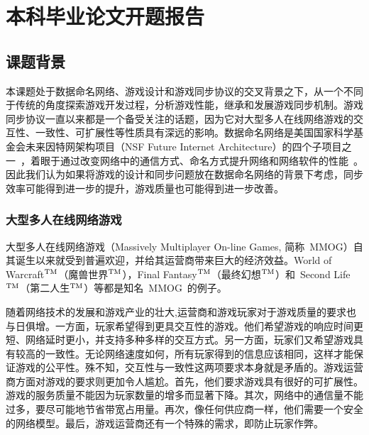 \chapter{本科毕业论文开题报告}

\def\tm{\leavevmode\hbox{$\rm {}^{TM}$}} %
\section{课题背景}
本课题处于数据命名网络、游戏设计和游戏同步协议的交叉背景之下，从一个不同于传统的角度探索游戏开发过程，分析游戏性能，继承和发展游戏同步机制。游戏同步协议一直以来都是一个备受关注的话题，因为它对大型多人在线网络游戏的交互性、一致性、可扩展性等性质具有深远的影响。数据命名网络是美国国家科学基金会未来因特网架构项目（NSF Future Internet Architecture）的四个子项目之一~\cite{nsffia}，着眼于通过改变网络中的通信方式、命名方式提升网络和网络软件的性能~\cite{Jndn}。因此我们认为如果将游戏的设计和同步问题放在数据命名网络的背景下考虑，同步效率可能得到进一步的提升，游戏质量也可能得到进一步改善。

\subsection{大型多人在线网络游戏}
大型多人在线网络游戏（Massively Multiplayer On-line Games, 简称~MMOG）自其诞生以来就受到普遍欢迎，并给其运营商带来巨大的经济效益。World of Warcraft\tm（魔兽世界\tm），Final Fantasy\tm（最终幻想\tm）和~Second Life\tm（第二人生\tm）等都是知名~MMOG~的例子。

随着网络技术的发展和游戏产业的壮大,运营商和游戏玩家对于游戏质量的要求也与日俱增。一方面，玩家希望得到更具交互性的游戏。他们希望游戏的响应时间更短、网络延时更小，并支持多种多样的交互方式。另一方面，玩家们又希望游戏具有较高的一致性。无论网络速度如何，所有玩家得到的信息应该相同，这样才能保证游戏的公平性。殊不知，交互性与一致性这两项要求本身就是矛盾的。游戏运营商方面对游戏的要求则更加令人尴尬。首先，他们要求游戏具有很好的可扩展性。游戏的服务质量不能因为玩家数量的增多而显著下降。其次，网络中的通信量不能过多，要尽可能地节省带宽占用量。再次，像任何供应商一样，他们需要一个安全的网络模型。最后，游戏运营商还有一个特殊的需求，即防止玩家作弊。

